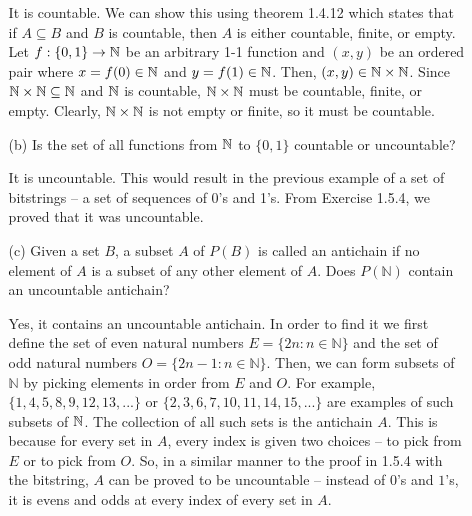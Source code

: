 \documentclass[12pt,letterpaper]{article}
\begin{document}
\begin{itemize}[leftmargin=!,labelindent=5pt]
\begin{itemize}
                It is countable.
                We can show this using theorem 1.4.12 which states that if $A \subseteq B$ and $B$ is countable, then $A$ is either countable, finite, or empty.
                Let $f: \{0,1\} \to \mathbb{N}$ be an arbitrary 1-1 function and $(x,y)$ be an ordered pair where $x = f(0) \in \mathbb{N}$ and $y = f(1) \in \mathbb{N}$.
                Then, $(x,y) \in \mathbb{N} \times \mathbb{N}$.
                Since $\mathbb{N}\times \mathbb{N} \subseteq \mathbb{N}$ and $\mathbb{N}$ is countable, $\mathbb{N}\times \mathbb{N}$ must be countable, finite, or empty.
                Clearly, $\mathbb{N} \times \mathbb{N}$ is not empty or finite, so it must be countable.
                \item [(b)] Is the set of all functions from $\mathbb{N}$ to $\{0, 1\}$ countable or uncountable?
                
                It is uncountable.
                This would result in the previous example of a set of bitstrings -- a set of sequences of 0's and 1's.
                From Exercise 1.5.4, we proved that it was uncountable.
                \item [(c)] Given a set $B$, a subset $A$ of $P(B)$ is called an antichain if no element of $A$ is a subset of any other element of $A$. Does $P(\mathbb{N})$ contain an uncountable antichain?
                
                Yes, it contains an uncountable antichain.
                In order to find it we first define the set of even natural numbers $E = \{2n : n \in \mathbb{N}\}$ and the set of odd natural numbers $O = \{2n-1 : n \in \mathbb{N}\}$.
                Then, we can form subsets of $\mathbb{N}$ by picking elements in order from $E$ and $O$.
                For example, $\{1,4,5,8,9,12,13,...\}$ or $\{2,3,6,7,10,11,14,15,...\}$ are examples of such subsets of $\mathbb{N}$.
                The collection of all such sets is the antichain $A$.
                This is because for every set in $A$, every index is given two choices -- to pick from $E$ or to pick from $O$.
                So, in a similar manner to the proof in 1.5.4 with the bitstring, $A$ can be proved to be uncountable -- instead of $0$'s and $1$'s, it is evens and odds at every index of every set in $A$.
            \end{itemize}
\end{itemize}
\end{document}
